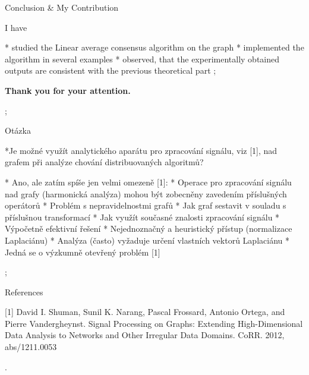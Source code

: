 








\sec Conclusion \& My Contribution

I have 

* studied the Linear average consensus algorithm on the graph 
* implemented the  algorithm in  several examples
* observed, that the experimentally obtained outputs are consistent with the previous theoretical part
\pg;

\null
\vskip2cm
\centerline{\typosize[35/40]\bf Thank you for your attention.}\pg;



\sec  Otázka

*Je možné využít analytického aparátu pro zpracování signálu, viz [1],  \nl   nad grafem při
analýze chování distribuovaných algoritmů?

* Ano, ale zatím spíše jen velmi omezeně [1]: 
\begitems
* Operace pro zpracování signálu nad grafy (harmonická analýza) mohou být zobecněny zavedením příslušných operátorů
* Problém s nepravidelnostmi grafů
\begitems
* Jak graf sestavit v souladu s příslušnou transformací
* Jak využít současné znalosti zpracování signálu
* Výpočetně efektivní řešení 
\enditems
* Nejednoznačný a heuristický přístup (normalizace Laplaciánu)
* Analýza (často) vyžaduje určení vlastních vektorů Laplaciánu
\enditems
* Jedná se o výzkumně otevřený problém [1]

\pg;

\sec References

 [1] David I. Shuman, Sunil K. Narang, Pascal Frossard, Antonio Ortega, and Pierre
Vandergheynst. Signal Processing on Graphs: Extending High-Dimensional
Data Analysis to Networks and Other Irregular Data Domains. CoRR. 2012,
abs/1211.0053 


\pg. %

